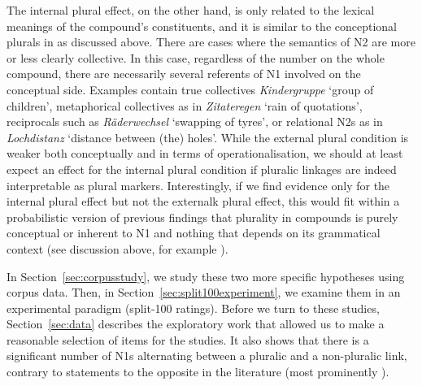 The internal plural effect, on the other hand, is only related to the lexical meanings of the compound's constituents, and it is similar to the conceptional plurals in \textcite{BangaEa2013b} as discussed above.
There are cases where the semantics of N2 are more or less clearly collective.
In this case, regardless of the number on the whole compound, there are necessarily several referents of N1 involved on the conceptual side.
Examples contain true collectives \textit{Kindergruppe} `group of children', metaphorical collectives as in \textit{Zitateregen} `rain of quotations', reciprocals such as \textit{Räderwechsel} `swapping of tyres', or relational N2s as in \textit{Lochdistanz} `distance between (the) holes'.
While the external plural condition is weaker both conceptually and in terms of operationalisation, we should at least expect an effect for the internal plural condition if pluralic linkages are indeed interpretable as plural markers.
Interestingly, if we find evidence only for the internal plural effect but not the externalk plural effect, this would fit within a probabilistic version of previous findings that plurality in compounds is purely conceptual or inherent to N1 and nothing that depends on its grammatical context (see discussion above, for example \citealt{Gallmann1998}).

In Section~\ref{sec:corpusstudy}, we study these two more specific hypotheses using corpus data.
Then, in Section~\ref{sec:split100experiment}, we examine them in an experimental paradigm (split-100 ratings).
Before we turn to these studies, Section~\ref{sec:data} describes the exploratory work that allowed us to make a reasonable selection of items for the studies.
It also shows that there is a significant number of N1s alternating between a pluralic and a non-pluralic link, contrary to statements to the opposite in the literature (most prominently \citealt{NeefBorgwaldt2012,Neef2015}).
